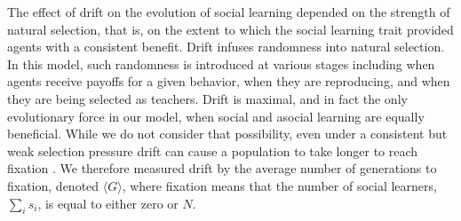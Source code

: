 \documentclass[letterpaper,11.5pt]{scrartcl}
\begin{document}
The effect of drift on the evolution of social learning %
depended on the strength of natural selection, that is, on the extent to which the social learning trait provided agents with a consistent benefit. Drift infuses randomness into natural selection. In this model, such randomness is introduced at various stages including when agents receive payoffs for a given behavior, when they are reproducing, and when they are being selected as teachers. Drift is maximal, and in fact the only evolutionary force in our model, when social and asocial learning are equally beneficial. While we do not consider that possibility, even under a consistent but weak selection pressure drift can cause a population to take longer to reach fixation \cite{plutynski2007drift}. We therefore measured drift by the average number of generations to fixation, denoted $\langle G \rangle$, where fixation means that the number of social learners, $\sum_i s_i$, is equal to either zero or $N$. %
\end{document}
